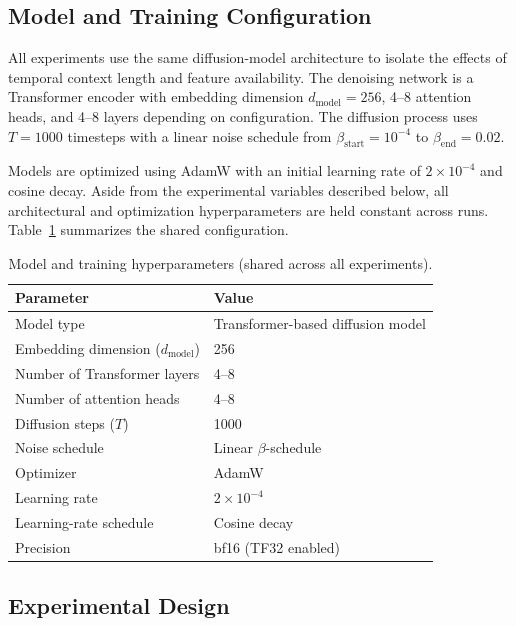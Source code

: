 \subsection{Model and Training Configuration}
\label{sec:model-config}

All experiments use the same diffusion-model architecture to isolate the effects of temporal context length and feature availability. The denoising network is a Transformer encoder with embedding dimension $d_{\text{model}}=256$, 4--8 attention heads, and 4--8 layers depending on configuration. The diffusion process uses $T=1000$ timesteps with a linear noise schedule from $\beta_{\text{start}}=10^{-4}$ to $\beta_{\text{end}}=0.02$.

Models are optimized using AdamW with an initial learning rate of $2 \times 10^{-4}$ and cosine decay. Aside from the experimental variables described below, all architectural and optimization hyperparameters are held constant across runs. Table~\ref{tab:hyperparams} summarizes the shared configuration.

\begin{table}[t]
\centering
\caption{Model and training hyperparameters (shared across all experiments).}
\label{tab:hyperparams}
\begin{tabular}{ll}
\toprule
\textbf{Parameter} & \textbf{Value} \\
\midrule
Model type & Transformer-based diffusion model \\
Embedding dimension ($d_{\text{model}}$) & 256 \\
Number of Transformer layers & 4--8 \\
Number of attention heads & 4--8 \\
Diffusion steps ($T$) & 1000 \\
Noise schedule & Linear $\beta$-schedule \\
Optimizer & AdamW \\
Learning rate & $2 \times 10^{-4}$ \\
Learning-rate schedule & Cosine decay \\
Precision & bf16 (TF32 enabled) \\
\bottomrule
\end{tabular}
\end{table}

\subsection{Experimental Design}

